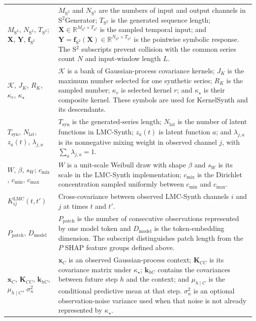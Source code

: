 \begin{longtable}{@{}
>{\raggedright\arraybackslash}p{}
>{\raggedright\arraybackslash}p{}@{}}
$M_{\mathrm{S^2}}$, $N_{\mathrm{S^2}}$, $T_{\mathrm{S^2}}$;
$\mathbf X$, $\mathbf Y$, $\mathbf f_{\mathrm{S^2}}$ &
$M_{\mathrm{S^2}}$ and $N_{\mathrm{S^2}}$ are the numbers of input and output
channels in S$^2$Generator; $T_{\mathrm{S^2}}$ is the generated sequence
length; $\mathbf X\in\mathbb R^{M_{\mathrm{S^2}}\times T_{\mathrm{S^2}}}$
is the sampled temporal input; and
$\mathbf Y=\mathbf f_{\mathrm{S^2}}(\mathbf X)\in
\mathbb R^{N_{\mathrm{S^2}}\times T_{\mathrm{S^2}}}$ is the pointwise
symbolic response. The S$^2$ subscripts prevent collision with the common
series count $N$ and input-window length $L$. \\

$\mathcal K$, $J_K$, $R_K$, $\kappa_r$, $\kappa_\star$ &
$\mathcal K$ is a bank of Gaussian-process covariance kernels; $J_K$ is the
maximum number selected for one synthetic series; $R_K$ is the sampled number;
$\kappa_r$ is selected kernel $r$; and $\kappa_\star$ is their composite
kernel. These symbols are used for KernelSynth and its descendants. \\

$T_{\mathrm{syn}}$, $N_{\mathrm{lat}}$, $z_a(t)$,
$\lambda_{j,a}$ &
$T_{\mathrm{syn}}$ is the generated-series length; $N_{\mathrm{lat}}$ is the
number of latent functions in LMC-Synth; $z_a(t)$ is latent function $a$; and
$\lambda_{j,a}$ is its nonnegative mixing weight in observed channel $j$,
with $\sum_a\lambda_{j,a}=1$. \\

$W$, $\beta$, $s_W$; $c_{\mathrm{mix}}$, $c_{\min}$, $c_{\max}$ &
$W$ is a unit-scale Weibull draw with shape $\beta$ and $s_W$ is its scale in
the LMC-Synth implementation; $c_{\mathrm{mix}}$ is the Dirichlet concentration
sampled uniformly between $c_{\min}$ and $c_{\max}$. \\

$K^{\mathrm{LMC}}_{ij}(t,t')$ &
Cross-covariance between observed LMC-Synth channels $i$ and $j$ at times
$t$ and $t'$. \\

$P_{\mathrm{patch}}$, $D_{\mathrm{model}}$ &
$P_{\mathrm{patch}}$ is the number of consecutive observations represented by
one model token and $D_{\mathrm{model}}$ is the token-embedding dimension.
The subscript distinguishes patch length from the $P$ SHAP feature groups
defined above. \\

$\mathbf x_C$, $\mathbf K_{CC}$, $\mathbf k_{hC}$,
$\mu_{h\mid C}$, $\sigma_n^2$ &
$\mathbf x_C$ is an observed Gaussian-process context; $\mathbf K_{CC}$ is
its covariance matrix under $\kappa_\star$; $\mathbf k_{hC}$ contains the
covariances between future step $h$ and the context; and $\mu_{h\mid C}$ is
the conditional predictive mean at that step. $\sigma_n^2$ is an optional
observation-noise variance used when that noise is not already represented by
$\kappa_\star$. \\


\end{longtable}
